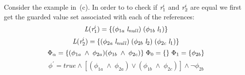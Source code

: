 Consider the example in~(c). In order to to check
if $\emph{r}_1^i$ and $\emph{r}_2^i$ are equal we first get the 
guarded value set associated with each of the references:
\[
\emph{L}(\emph{r}_1^i) = \{ (\phi_{1a}\; \emph{l}_\mathit{null})\; (\phi_{1b}\; \emph{l}_1) \} 
\]
\[
\emph{L}(\emph{r}_2^i) = \{ (\phi_{2a}\; \emph{l}_\mathit{null})\; (\phi_{2b}\; \emph{l}_2)\; (\phi_{2c}\; \emph{l}_1) \} \\
\]
\[
\Phi_\alpha = \{ (\phi_{1a}\; \wedge\; \phi_{2a} ) (\phi_{1b}\; \wedge\; \phi_{2c} ) \}\;
\Phi_0 = \{ \}\; \Phi_1 = \{ \phi_{2b}\} \\
\]
\[
\phi^\prime = \mathit{true} \wedge [ (\phi_{1a}\; \wedge\; \phi_{2a} )\vee (\phi_{1b}\; \wedge\; \phi_{2c} ) ] \wedge \neg\phi_{2b} 
\]





